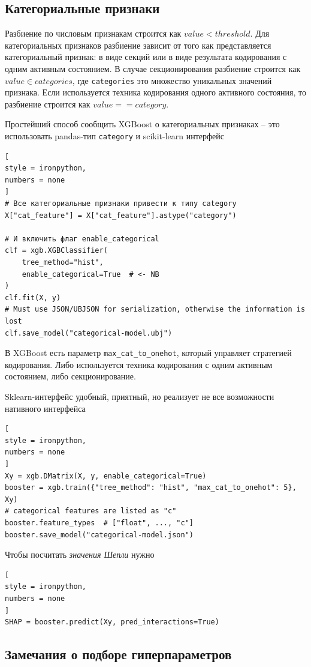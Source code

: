 \documentclass[%
	11pt,
	a4paper,
	utf8,
		]{article}
\begin{document}
\subsection{Категориальные признаки}

Разбиение по числовым признакам строится как $ value < threshold $. Для категориальных признаков разбиение зависит от того как представляется категориальный признак: в виде секций или в виде результата кодирования с одним активным состоянием. В случае секционирования разбиение строится как $ value \in categories $, где  \verb|categories| это множество уникальных значений признака. Если используется техника кодирования одного активного состояния, то разбиение строится как $ value == category $.

Простейший способ сообщить XGBoost о категориальных признаках -- это использовать pandas-тип \verb|category| и scikit-learn интерфейс
\begin{lstlisting}[
style = ironpython,
numbers = none
]
# Все категориальные признаки привести к типу category
X["cat_feature"] = X["cat_feature"].astype("category")

# И включить флаг enable_categorical
clf = xgb.XGBClassifier(
    tree_method="hist",
    enable_categorical=True  # <- NB
)
clf.fit(X, y)
# Must use JSON/UBJSON for serialization, otherwise the information is lost
clf.save_model("categorical-model.ubj")
\end{lstlisting}

В XGBoost есть параметр \verb|max_cat_to_onehot|, который управляет стратегией кодирования. Либо используется техника кодирования с одним активным состоянием, либо секционирование.

Sklearn-интерфейс удобный, приятный, но реализует не все возможности нативного интерфейса
\begin{lstlisting}[
style = ironpython,
numbers = none
]
Xy = xgb.DMatrix(X, y, enable_categorical=True)
booster = xgb.train({"tree_method": "hist", "max_cat_to_onehot": 5}, Xy)
# categorical features are listed as "c"
booster.feature_types  # ["float", ..., "c"]
booster.save_model("categorical-model.json")
\end{lstlisting}

Чтобы посчитать \emph{значения Шепли} нужно
\begin{lstlisting}[
style = ironpython,
numbers = none
]
SHAP = booster.predict(Xy, pred_interactions=True)
\end{lstlisting}


\subsection{Замечания о подборе гиперпараметров}
\end{document}
